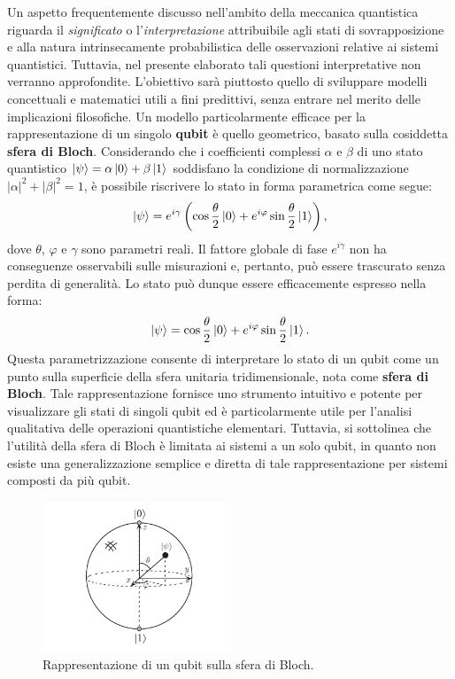 \documentclass[a4paper,12pt]{report}
\theoremstyle{plain}
\begin{document}
\noindent Un aspetto frequentemente discusso nell'ambito della meccanica quantistica riguarda il \textit{significato} o l'\textit{interpretazione} attribuibile agli stati di sovrapposizione e alla natura intrinsecamente probabilistica delle osservazioni relative ai sistemi quantistici. Tuttavia, nel presente elaborato tali questioni interpretative non verranno approfondite. L'obiettivo sarà piuttosto quello di sviluppare modelli concettuali e matematici utili a fini predittivi, senza entrare nel merito delle implicazioni filosofiche.
Un modello particolarmente efficace per la rappresentazione di un singolo \textbf{qubit} è quello geometrico, basato sulla cosiddetta \textbf{sfera di Bloch}.
Considerando che i coefficienti complessi $\alpha$ e $\beta$ di uno stato quantistico $\ket{\psi} = \alpha\ket{0} + \beta\ket{1}$ soddisfano la condizione di normalizzazione $|\alpha|^2 + |\beta|^2 = 1$, è possibile riscrivere lo stato in forma parametrica come segue:
\[
\ket{\psi} = e^{i\gamma} \left( \cos\frac{\theta}{2}\ket{0} + e^{i\varphi} \sin\frac{\theta}{2}\ket{1} \right),
\]
dove $\theta$, $\varphi$ e $\gamma$ sono parametri reali.
Il fattore globale di fase $e^{i\gamma}$ non ha conseguenze osservabili sulle misurazioni e, pertanto, può essere trascurato senza perdita di generalità. Lo stato può dunque essere efficacemente espresso nella forma:
\[
\ket{\psi} = \cos\frac{\theta}{2}\ket{0} + e^{i\varphi} \sin\frac{\theta}{2}\ket{1}.
\]
Questa parametrizzazione consente di interpretare lo stato di un qubit come un punto sulla superficie della sfera unitaria tridimensionale, nota come \textbf{sfera di Bloch}. Tale rappresentazione fornisce uno strumento intuitivo e potente per visualizzare gli stati di singoli qubit ed è particolarmente utile per l'analisi qualitativa delle operazioni quantistiche elementari. Tuttavia, si sottolinea che l'utilità della sfera di Bloch è limitata ai sistemi a un solo qubit, in quanto non esiste una generalizzazione semplice e diretta di tale rappresentazione per sistemi composti da più qubit.
\begin{figure}[H]
    \centering
    \includegraphics[width=0.5\textwidth]{Immagine2.png} 
    \caption{Rappresentazione di un qubit sulla sfera di Bloch.}
    \label{Immagine2}
\end{figure}
\end{document}
